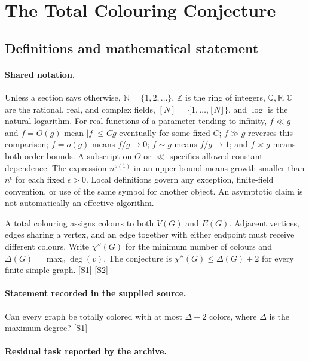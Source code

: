 \documentclass[11pt,a4paper]{article}
\newcommand{\N}{\mathbb{N}}
\newcommand{\Z}{\mathbb{Z}}
\newcommand{\Q}{\mathbb{Q}}
\newcommand{\R}{\mathbb{R}}
\newcommand{\C}{\mathbb{C}}
\newcommand{\sref}[2]{\hyperlink{source:#1:#2}{[S#2]}}
\begin{document}
\section{The Total Colouring Conjecture}\label{statement}


\subsection{Definitions and mathematical statement}

\paragraph{Shared notation.}Unless a section says otherwise, $\N=\{1,2,\ldots\}$,
$\Z$ is the ring of integers, $\Q,\R,\C$ are the rational, real, and complex
fields, $[N]=\{1,\ldots,\lfloor N\rfloor\}$, and $\log$ is the natural
logarithm. For real functions of a parameter tending to infinity,
$f\ll g$ and $f=O(g)$ mean $|f|\leq Cg$ eventually for some fixed $C$;
$f\gg g$ reverses this comparison; $f=o(g)$ means $f/g\to0$;
$f\sim g$ means $f/g\to1$; and $f\asymp g$ means both order bounds.
A subscript on $O$ or $\ll$ specifies allowed constant dependence.
The expression $n^{o(1)}$ in an upper bound means growth smaller than
$n^\epsilon$ for each fixed $\epsilon>0$. Local definitions govern any
exception, finite-field convention, or use of the same symbol for another
object. An asymptotic claim is not automatically an effective algorithm.



A total colouring assigns colours to both $V(G)$ and $E(G)$. Adjacent vertices, edges sharing a vertex, and an edge together with either endpoint must receive different colours. Write $\chi''(G)$ for the minimum number of colours and $\Delta(G)=\max_v\deg(v)$. The conjecture is $\chi''(G)\leq\Delta(G)+2$ for every finite simple graph. \sref{statement}{1} \sref{statement}{2}

\paragraph{Statement recorded in the supplied source.}
Can every graph be totally colored with at most $\Delta + 2$ colors, where $\Delta$ is the maximum degree? \sref{statement}{1}

\paragraph{Residual task reported by the archive.}
\end{document}
